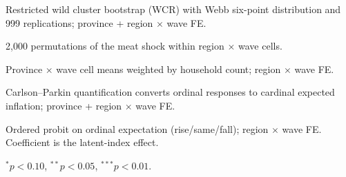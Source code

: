 \begin{table}[!htbp]
\begin{threeparttable}
\begin{tablenotes}[flushleft]
\item[a] Restricted wild cluster bootstrap (WCR) with Webb six-point distribution and 999 replications; province + region $\times$ wave FE.
\item[b] 2,000 permutations of the meat shock within region $\times$ wave cells.
\item[c] Province $\times$ wave cell means weighted by household count; region $\times$ wave FE.
\item[d] Carlson--Parkin quantification converts ordinal responses to cardinal expected inflation; province + region $\times$ wave FE.
\item[e] Ordered probit on ordinal expectation (rise/same/fall); region $\times$ wave FE. Coefficient is the latent-index effect.
\item $^{*}p<0.10$, $^{**}p<0.05$, $^{***}p<0.01$.
\end{tablenotes}
\end{threeparttable}
\end{table}
